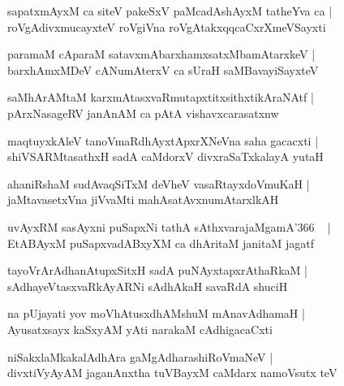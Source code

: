 \documentclass[twoside,12pt,openright]{book}
\newcounter{shloka}[chapter]
\begin{document}
\begin{shloka}%
sapatxmAyxM ca siteV pakeSxV paMcadAshAyxM tatheYva ca |\\
roVgAdivxmucayxteV roVgiVna roVgAtakxqqcaCxrXmeVSayxti 
\end{shloka}

\begin{shloka}%
paramaM cAparaM satavxmAbarxhamxsatxMbamAtarxkeV |\\
barxhAmxMDeV cANumAterxV ca sUraH saMBavayiSayxteV 
\end{shloka}

\begin{shloka}%
saMhArAMtaM karxmAtasxvaRmutapxtitxsithxtikAraNAtf |\\
pArxNasageRV janAnAM ca pAtA vishavxcarasatxnw 
\end{shloka}

\begin{shloka}%
maqtuyxkAleV tanoVmaRdhAyxtApxrXNeVna saha gacacxti |\\
shiVSARMtasathxH sadA caMdorxV divxraSaTxkalayA yutaH 
\end{shloka}

\begin{shloka}%
ahaniRshaM sudAvaqSiTxM deVheV vasaRtayxdoVmuKaH |\\
jaMtavasetxVna jiVvaMti mahAsatAvxnumAtarxlkAH
\end{shloka}

\begin{shloka}%
uvAyxRM sasAyxni puSapxNi tathA sAthxvarajaMgamA\char'366 ~ |\\
EtABAyxM puSapxvadABxyXM ca dhAritaM janitaM jagatf 
\end{shloka}

\begin{shloka}%
tayoVrArAdhanAtupxSitxH sadA puNAyxtapxrAthaRkaM |\\
sAdhayeVtasxvaRkAyARNi sAdhAkaH savaRdA shuciH 
\end{shloka}

\begin{shloka}%
na pUjayati yov moVhAtusxdhAMshuM mAnavAdhamaH |\\
Ayusatxsayx kaSxyAM yAti narakaM cAdhigacaCxti 
\end{shloka}

\begin{shloka}%
niSakxlaMkakalAdhAra gaMgAdharashiRoVmaNeV |\\
divxtiVyAyAM jaganAnxtha tuVBayxM caMdarx namoVsutx teV 
\end{shloka}
\end{document}
